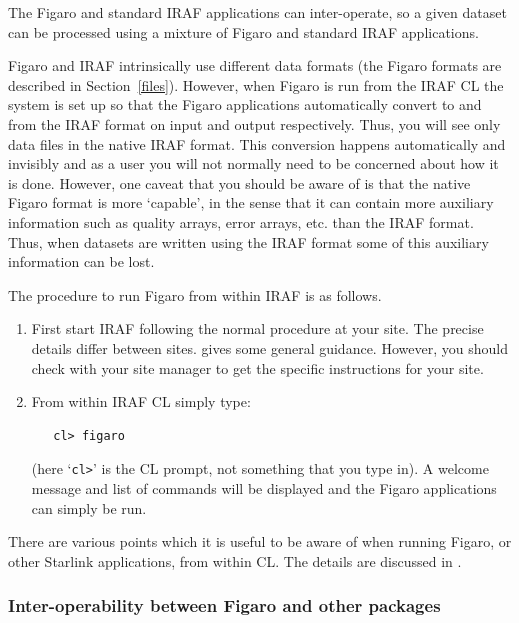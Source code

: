    The Figaro and standard IRAF applications can inter-operate, so a
   given dataset can be processed using a mixture of Figaro and standard
   IRAF applications.

   Figaro and IRAF intrinsically use different data formats (the Figaro
   formats are described in Section~\ref{files}).  However, when Figaro
   is run from the IRAF CL the system is set up so that the Figaro
   applications  automatically convert to and from the IRAF format on
   input and output respectively.  Thus, you will see only data files
   in the native IRAF format.  This conversion happens automatically
   and invisibly and as a user you will not normally need to be
   concerned about how it is done.  However, one caveat that you should
   be aware of is that the native Figaro format is more `capable', in
   the sense that it can contain more auxiliary information  such as
   quality arrays, error arrays, etc. than the IRAF format.  Thus, when
   datasets are written using the IRAF format some of this auxiliary
   information can be lost.

   The procedure to run Figaro from within IRAF is as follows.

  \begin{enumerate}

    \item First start IRAF following the normal procedure at your site.
     The precise details differ between sites.  
     gives some general guidance.   However, you should check with your
     site manager to get the specific instructions for your site.

    \item From within IRAF CL simply type:

\begin{verbatim}
   cl> figaro
\end{verbatim}

     (here `\verb-cl>-' is the CL prompt, not something that you type
     in).  A welcome message and list of commands will be displayed and
     the Figaro applications can simply be run.

  \end{enumerate}

   There are various points which it is useful to be aware of when
   running Figaro, or other Starlink applications, from within CL.
   The details are discussed in .

\subsubsection{Inter-operability between Figaro and other packages}

